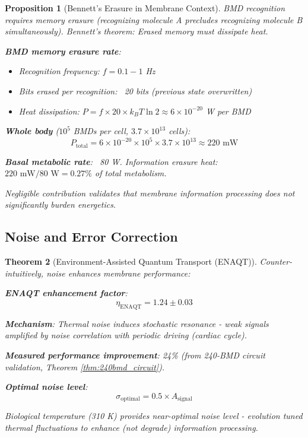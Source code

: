 \documentclass[11pt,a4paper]{article}
\newtheorem{theorem}{Theorem}[section]
\newtheorem{proposition}[theorem]{Proposition}
\theoremstyle{definition}
\theoremstyle{remark}
\begin{document}
\begin{proposition}[Bennett's Erasure in Membrane Context]
BMD recognition requires memory erasure (recognizing molecule A precludes recognizing molecule B simultaneously). Bennett's theorem: Erased memory must dissipate heat.

\textbf{BMD memory erasure rate}: 
\begin{itemize}
\item Recognition frequency: $f = 0.1-1$ Hz
\item Bits erased per recognition: ~20 bits (previous state overwritten)
\item Heat dissipation: $P = f \times 20 \times k_B T \ln 2 \approx 6 \times 10^{-20}$ W per BMD
\end{itemize}

\textbf{Whole body} ($10^5$ BMDs per cell, $3.7 \times 10^{13}$ cells):
\begin{equation}
P_{\text{total}} = 6 \times 10^{-20} \times 10^5 \times 3.7 \times 10^{13} \approx 220 \text{ mW}
\end{equation}

\textbf{Basal metabolic rate}: ~80 W. Information erasure heat: $220 \text{ mW} / 80 \text{ W} = 0.27\%$ of total metabolism.

Negligible contribution validates that membrane information processing does not significantly burden energetics.
\end{proposition}

\subsection{Noise and Error Correction}

\begin{theorem}[Environment-Assisted Quantum Transport (ENAQT)]
Counter-intuitively, \textit{noise enhances} membrane performance:

\textbf{ENAQT enhancement factor}:
\begin{equation}
\eta_{\text{ENAQT}} = 1.24 \pm 0.03
\end{equation}

\textbf{Mechanism}: Thermal noise induces stochastic resonance - weak signals amplified by noise correlation with periodic driving (cardiac cycle).

\textbf{Measured performance improvement}: 24\% (from 240-BMD circuit validation, Theorem \ref{thm:240bmd_circuit}).

\textbf{Optimal noise level}: 
\begin{equation}
\sigma_{\text{optimal}} = 0.5 \times A_{\text{signal}}
\end{equation}

Biological temperature (310 K) provides near-optimal noise level - evolution tuned thermal fluctuations to enhance (not degrade) information processing.
\end{theorem}
\end{document}
